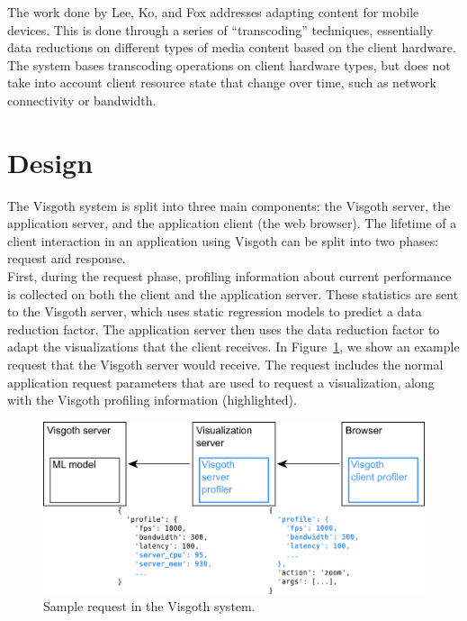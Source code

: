 The work done by Lee, Ko, and Fox \cite{adapting-heterogeneous} addresses
adapting content for mobile devices.  This is done through a series of
``transcoding'' techniques, essentially data reductions on different types of
media content based on the client hardware.  The system bases transcoding
operations on client hardware types, but does not take into account client
resource state that change over time, such as network connectivity or
bandwidth.\\

\section{Design}\label{visgoth-ch:design}

The Visgoth system is split into three main components: the Visgoth server, the
application server, and the application client (the web browser). The lifetime
of a client interaction in an application using Visgoth can be split into two
phases: request and response. \\

First, during the request phase, profiling information about current
performance is collected on both the client and the application server. These
statistics are sent to the Visgoth server, which uses static regression models
to predict a data reduction factor. The application server then uses the data
reduction factor to adapt the visualizations that the client receives. In
Figure~\ref{fig:system-request}, we show an example request that the Visgoth
server would receive. The request includes the normal application request
parameters that are used to request a visualization, along with the Visgoth
profiling information (highlighted).\\

\begin{figure}[h]
\begin{center}
\includegraphics[scale=0.5]{./img/system-request.png}
\caption{Sample request in the Visgoth system.}
\label{fig:system-request}
\end{center}
\end{figure}

